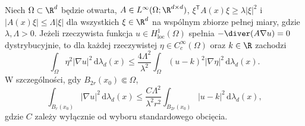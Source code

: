 \begin{twierdzenie}
\label{thm:pde14-caccioppoli}
Niech $\Omega\subset\R^d$ będzie otwarta,
$A\in L^\infty(\Omega;\R^{d\times d})$,
$\xi^{\mathsf T}A(x)\xi\ge\lambda|\xi|^2$ i
$|A(x)\xi|\le\Lambda|\xi|$ dla wszystkich $\xi\in\R^d$
na wspólnym zbiorze pełnej miary, gdzie $\lambda,\Lambda>0$.
Jeżeli rzeczywista funkcja $u\in H^1_{\mathrm{loc}}(\Omega)$
spełnia $-\diver(A\nabla u)=0$ dystrybucyjnie, to dla każdej
rzeczywistej $\eta\in C_c^\infty(\Omega)$ oraz $k\in\R$ zachodzi
\begin{equation}\label{eq:pde14-caccioppoli}
 \int_\Omega\eta^2|\nabla u|^2\,\mathrm d\lambda_d(x)
 \le \frac{4\Lambda^2}{\lambda^2}
 \int_\Omega (u-k)^2|\nabla\eta|^2\,\mathrm d\lambda_d(x).
\end{equation}
W szczególności, gdy $B_{2r}(x_0)\Subset\Omega$,
\[
 \int_{B_r(x_0)}|\nabla u|^2\,\mathrm d\lambda_d(x)
 \le \frac{C\Lambda^2}{\lambda^2r^2}
 \int_{B_{2r}(x_0)}|u-k|^2\,\mathrm d\lambda_d(x),
\]
gdzie $C$ zależy wyłącznie od wyboru standardowego obcięcia.
\end{twierdzenie}
